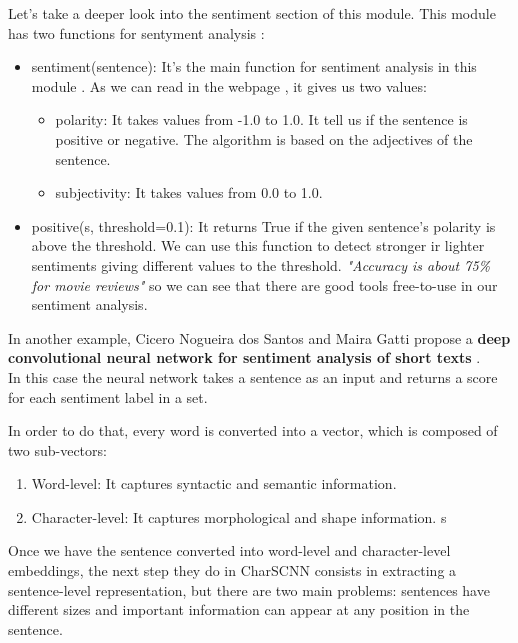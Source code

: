 \documentclass[12pt,twoside]{article}
\theoremstyle{plain}
\theoremstyle{definition}
\theoremstyle{remark}
\begin{document}
		Let's take a deeper look into the sentiment section of this module. This module has two functions for sentyment analysis \cite{python_module_sentiment}:
		
		\begin{itemize}
			\item sentiment(sentence): It's the main function for sentiment analysis in this module . As we can read in the webpage \cite{python_module_sentiment}, it gives us two values:
			
			\begin{itemize}
				\item polarity: It takes values from -1.0 to 1.0. It tell us if the sentence is positive or negative. The algorithm is based on the adjectives of the sentence.
				\item subjectivity: It takes values from 0.0 to 1.0.
			\end{itemize}
			
			\item positive(s, threshold=0.1): It returns True if the given sentence's polarity is above the threshold. We can use this function to detect stronger ir lighter sentiments giving different values to the threshold. \textit{"Accuracy is about 75\% for movie reviews" }\cite{python_module_sentiment} so we can see that there are good tools free-to-use in our sentiment analysis. 
		\end{itemize}
		
		In another example, Cicero Nogueira dos Santos and Maira Gatti propose a \textbf{deep convolutional neural network for sentiment analysis of short texts} \cite{glorot2011domain}.\\
		
		In this case the neural network takes a sentence as an input and returns a score for each sentiment label in a set. \\
			
		\newpage
		
		In order to do that, every word is converted into a vector, which is composed of two sub-vectors:
		
		\begin{enumerate}
			\item Word-level: It captures syntactic and semantic information.
			\item Character-level: It captures morphological and shape information.
s\end{enumerate}
	
		Once we have the sentence converted into word-level and character-level embeddings, the next step they do in CharSCNN consists in extracting a sentence-level representation, but there are two main problems: sentences have different sizes and important information can appear at any position in the sentence. \\
		
\end{document}
